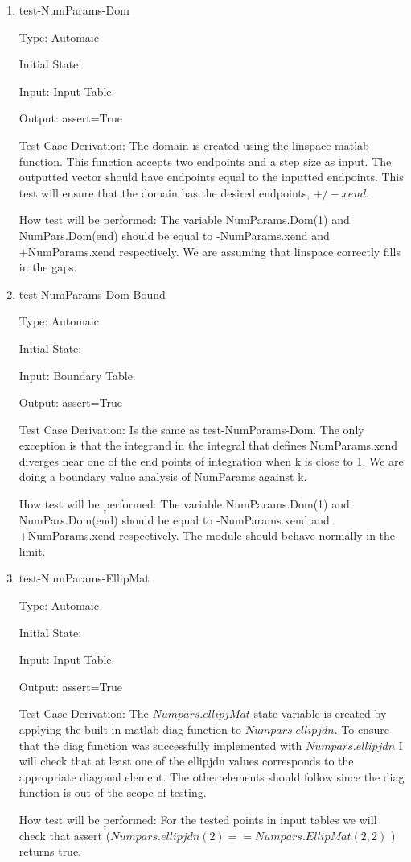 \documentclass[12pt, titlepage]{article}
\begin{document}
\begin{enumerate}
\item{test-NumParams-Dom\\}

Type: Automaic

Initial State: 

Input: Input Table. 

Output: assert=True

Test Case Derivation: The domain is created using the linspace matlab function. 
This function accepts two endpoints and a step size as input. The outputted 
vector should have endpoints equal to the inputted endpoints. This test will 
ensure that the domain has the desired endpoints, $+/- xend$. 

How test will be performed: The variable NumParams.Dom(1) and NumPars.Dom(end) 
should be equal to -NumParams.xend and +NumParams.xend respectively. We are 
assuming that linspace correctly fills in the gaps.  

\item{test-NumParams-Dom-Bound\\}

Type: Automaic

Initial State: 

Input: Boundary Table. 

Output: assert=True

Test Case Derivation: Is the same as test-NumParams-Dom. The only exception is 
that the integrand in the integral that defines NumParams.xend diverges near 
one of 
the end points 
of integration when k is close to 1. We are doing a boundary value analysis of 
NumParams against k. 

How test will be performed: The variable NumParams.Dom(1) and NumPars.Dom(end) 
should be equal to -NumParams.xend and +NumParams.xend respectively. The module 
should behave normally in the limit. 

\item{test-NumParams-EllipMat\\}

Type: Automaic

Initial State: 

Input: Input Table.

Output: assert=True

Test Case Derivation: The $Numpars.ellipjMat$ state variable is created by 
applying the built in matlab diag function to $Numpars.ellipjdn$. To ensure 
that the diag function was successfully implemented with $Numpars.ellipjdn$ I 
will check that at least one of the ellipjdn values corresponds to the 
appropriate diagonal element. The other elements should follow since the diag 
function is out of the scope of testing. 

How test will be performed: For the tested points in input tables we will 
check that assert 
($Numpars.ellipjdn(2)==Numpars.EllipMat(2,2)$ ) returns true. 
\end{enumerate} 
\end{document}
